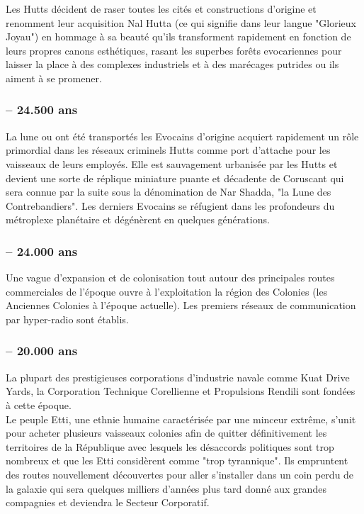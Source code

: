 \documentclass[twoside]{article}
\begin{document}
Les Hutts décident de raser toutes les cités et constructions d'origine et renomment leur acquisition Nal Hutta (ce qui signifie dans leur langue "Glorieux Joyau") en hommage à sa beauté qu'ils transforment rapidement en fonction de leurs propres canons esthétiques, rasant les superbes forêts evocariennes pour laisser la place à des complexes industriels et à des marécages putrides ou ils aiment à se promener. 
\subsubsection*{-- 24.500 ans}
La lune ou ont été transportés les Evocains d'origine acquiert rapidement un rôle primordial dans les réseaux criminels Hutts comme port d'attache pour les vaisseaux de leurs employés. Elle est sauvagement urbanisée par les Hutts et devient une sorte de réplique miniature puante et décadente de Coruscant qui sera connue par la suite sous la dénomination de Nar Shadda, "la Lune des Contrebandiers". Les derniers Evocains se réfugient dans les profondeurs du métroplexe planétaire et dégénèrent en quelques générations. 
\subsubsection*{-- 24.000 ans}
Une vague d'expansion et de colonisation tout autour des principales routes commerciales de l'époque ouvre à l'exploitation la région des Colonies (les Anciennes Colonies à l'époque actuelle). Les premiers réseaux de communication par hyper-radio sont établis. 
\subsubsection*{-- 20.000 ans}
La plupart des prestigieuses corporations d'industrie navale comme Kuat Drive Yards, la Corporation Technique Corellienne et Propulsions Rendili sont fondées à cette époque. \\

Le peuple Etti, une ethnie humaine caractérisée par une minceur extrême, s'unit pour acheter plusieurs vaisseaux colonies afin de quitter définitivement les territoires de la République avec lesquels les désaccords politiques sont trop nombreux et que les Etti considèrent comme "trop tyrannique". Ils empruntent des routes nouvellement découvertes pour aller s'installer dans un coin perdu de la galaxie qui sera quelques milliers d'années plus tard donné aux grandes compagnies et deviendra le Secteur Corporatif. \\
\end{document}
